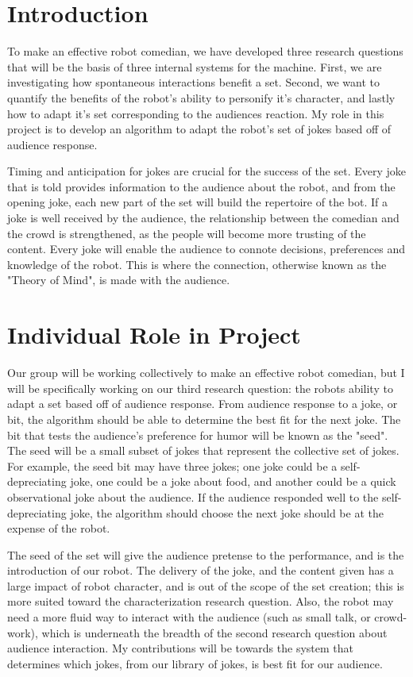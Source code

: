 \documentclass[onecolumn, draftclsnofoot,10pt, compsoc]{IEEEtran}
\begin{document}
\section{Introduction}

  To make an effective robot comedian, we have developed three research questions that will be the basis of three internal systems for the machine. First, we are investigating how spontaneous interactions benefit a set. Second, we want to quantify the benefits of the robot's ability to personify it's character, and lastly how to adapt it's set corresponding to the audiences reaction. My role in this project is to develop an algorithm to adapt the robot's set of jokes based off of audience response.

  Timing and anticipation for jokes are crucial for the success of the set. Every joke that is told provides information to the audience about the robot, and from the opening joke, each new part of the set will build the repertoire of the bot. If a joke is well received by the audience, the relationship between the comedian and the crowd is strengthened, as the people will become more trusting of the content. Every joke will enable the audience to connote decisions, preferences and knowledge of the robot. This is where the connection, otherwise known as the "Theory of Mind", is made with the audience\cite{leslie}.

\section{Individual Role in Project}

Our group will be working collectively to make an effective robot comedian, but I will be specifically working on our third research question: the robots ability to adapt a set based off of audience response. From audience response to a joke, or bit, the algorithm should be able to determine the best fit for the next joke. The bit that tests the audience's preference for humor will be known as the "seed". The seed will be a small subset of jokes that represent the collective set of jokes. For example, the seed bit may have three jokes; one joke could be a self-depreciating joke, one could be a joke about food, and another could be a quick observational joke about the audience. If the audience responded well to the self-depreciating joke, the algorithm should choose the next joke should be at the expense of the robot. 

The seed of the set will give the audience pretense to the performance, and is the introduction of our robot. The delivery of the joke, and the content given has a large impact of robot character, and is out of the scope of the set creation; this is more suited toward the characterization research question. Also, the robot may need a more fluid way to interact with the audience (such as small talk, or crowd-work), which is underneath the breadth of the second research question about audience interaction. My contributions will be towards the system that determines which jokes, from our library of jokes, is best fit for our audience.
\end{document}

